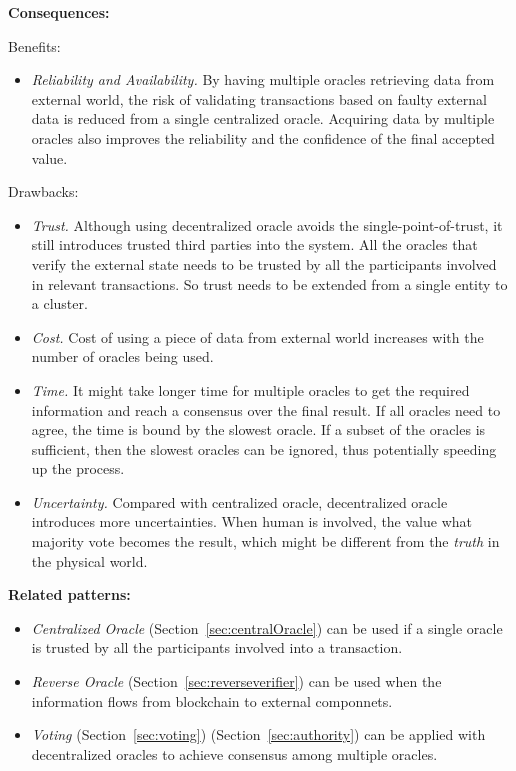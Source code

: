 \vspace{0.5em}\noindent \textbf{Consequences:} 

Benefits:
\begin{itemize}
  \item \textit{Reliability and Availability.} By having multiple oracles retrieving data from external world, the risk of validating transactions based on faulty external data is reduced from a single centralized oracle. Acquiring data by multiple oracles also improves the reliability and the confidence of the final accepted value. %
\end{itemize}

Drawbacks: 
\begin{itemize}
   \item \textit{Trust.} Although using decentralized oracle avoids the single-point-of-trust, it still introduces trusted third parties into the system. All the oracles that verify the external state needs to be trusted by all the participants involved in relevant transactions. So trust needs to be extended from a single entity to a cluster. 
  \item \textit{Cost.} Cost of using a piece of data from external world increases with the number of oracles being used.
  \item \textit{Time.} It might take longer time for multiple oracles to get the required information and reach a consensus over the final result. If all oracles need to agree, the time is bound by the slowest oracle. If a subset of the oracles is sufficient, then the slowest oracles can be ignored, thus potentially speeding up the process.
  \item \textit{Uncertainty.} Compared with centralized oracle, decentralized oracle introduces more uncertainties. When human is involved, the value what majority vote becomes the result, which might be different from the \textit{truth} in the physical world. 
\end{itemize}

\vspace{0.5em}\noindent \textbf{Related patterns:} 
\begin{itemize}
    \item \textit{Centralized Oracle} (Section~\ref{sec:centralOracle}) can be used if a single oracle is trusted by all the participants involved into a transaction.
    \item \textit{Reverse Oracle} (Section~\ref{sec:reverseverifier}) can be used when the information flows from blockchain to external componnets.
    \item \textit{Voting} (Section~\ref{sec:voting})  (Section~\ref{sec:authority}) can be applied with decentralized oracles to achieve consensus among multiple oracles.
    
\end{itemize}


